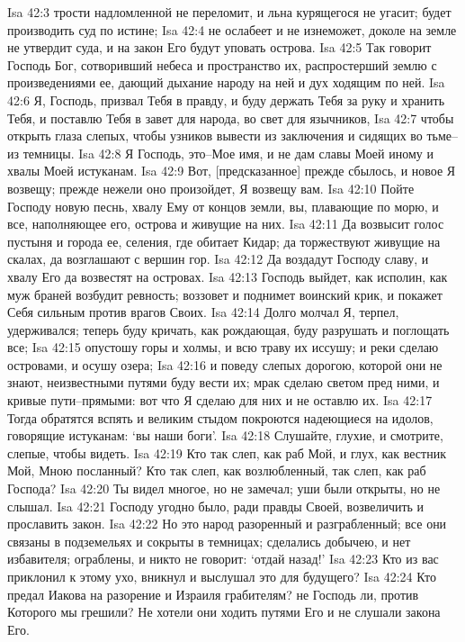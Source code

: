 Isa 42:3  трости надломленной не переломит, и льна курящегося не угасит; будет производить суд по истине;
Isa 42:4  не ослабеет и не изнеможет, доколе на земле не утвердит суда, и на закон Его будут уповать острова.
Isa 42:5  Так говорит Господь Бог, сотворивший небеса и пространство их, распростерший землю с произведениями ее, дающий дыхание народу на ней и дух ходящим по ней.
Isa 42:6  Я, Господь, призвал Тебя в правду, и буду держать Тебя за руку и хранить Тебя, и поставлю Тебя в завет для народа, во свет для язычников,
Isa 42:7  чтобы открыть глаза слепых, чтобы узников вывести из заключения и сидящих во тьме--из темницы.
Isa 42:8  Я Господь, это--Мое имя, и не дам славы Моей иному и хвалы Моей истуканам.
Isa 42:9  Вот, [предсказанное] прежде сбылось, и новое Я возвещу; прежде нежели оно произойдет, Я возвещу вам.
Isa 42:10  Пойте Господу новую песнь, хвалу Ему от концов земли, вы, плавающие по морю, и все, наполняющее его, острова и живущие на них.
Isa 42:11  Да возвысит голос пустыня и города ее, селения, где обитает Кидар; да торжествуют живущие на скалах, да возглашают с вершин гор.
Isa 42:12  Да воздадут Господу славу, и хвалу Его да возвестят на островах.
Isa 42:13  Господь выйдет, как исполин, как муж браней возбудит ревность; воззовет и поднимет воинский крик, и покажет Себя сильным против врагов Своих.
Isa 42:14  Долго молчал Я, терпел, удерживался; теперь буду кричать, как рождающая, буду разрушать и поглощать все;
Isa 42:15  опустошу горы и холмы, и всю траву их иссушу; и реки сделаю островами, и осушу озера;
Isa 42:16  и поведу слепых дорогою, которой они не знают, неизвестными путями буду вести их; мрак сделаю светом пред ними, и кривые пути--прямыми: вот что Я сделаю для них и не оставлю их.
Isa 42:17  Тогда обратятся вспять и великим стыдом покроются надеющиеся на идолов, говорящие истуканам: `вы наши боги'.
Isa 42:18  Слушайте, глухие, и смотрите, слепые, чтобы видеть.
Isa 42:19  Кто так слеп, как раб Мой, и глух, как вестник Мой, Мною посланный? Кто так слеп, как возлюбленный, так слеп, как раб Господа?
Isa 42:20  Ты видел многое, но не замечал; уши были открыты, но не слышал.
Isa 42:21  Господу угодно было, ради правды Своей, возвеличить и прославить закон.
Isa 42:22  Но это народ разоренный и разграбленный; все они связаны в подземельях и сокрыты в темницах; сделались добычею, и нет избавителя; ограблены, и никто не говорит: `отдай назад!'
Isa 42:23  Кто из вас приклонил к этому ухо, вникнул и выслушал это для будущего?
Isa 42:24  Кто предал Иакова на разорение и Израиля грабителям? не Господь ли, против Которого мы грешили? Не хотели они ходить путями Его и не слушали закона Его.
